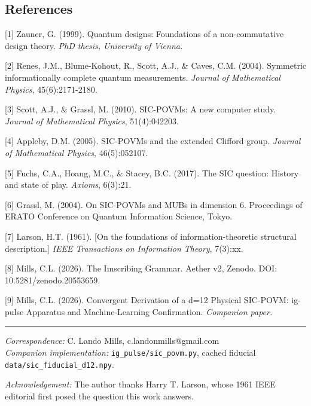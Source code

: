 \hypertarget{references}{%
\subsection{References}\label{references}}

{[}1{]} Zauner, G. (1999). Quantum designs: Foundations of a
non-commutative design theory. \emph{PhD thesis, University of Vienna.}

{[}2{]} Renes, J.M., Blume-Kohout, R., Scott, A.J., \& Caves, C.M.
(2004). Symmetric informationally complete quantum measurements.
\emph{Journal of Mathematical Physics}, 45(6):2171-2180.

{[}3{]} Scott, A.J., \& Grassl, M. (2010). SIC-POVMs: A new computer
study. \emph{Journal of Mathematical Physics}, 51(4):042203.

{[}4{]} Appleby, D.M. (2005). SIC-POVMs and the extended Clifford group.
\emph{Journal of Mathematical Physics}, 46(5):052107.

{[}5{]} Fuchs, C.A., Hoang, M.C., \& Stacey, B.C. (2017). The SIC
question: History and state of play. \emph{Axioms}, 6(3):21.

{[}6{]} Grassl, M. (2004). On SIC-POVMs and MUBs in dimension 6.
Proceedings of ERATO Conference on Quantum Information Science, Tokyo.

{[}7{]} Larson, H.T. (1961). {[}On the foundations of
information-theoretic structural description.{]} \emph{IEEE Transactions
on Information Theory}, 7(3):xx.

{[}8{]} Mills, C.L. (2026). The Imscribing Grammar. Aether v2, Zenodo.
DOI: 10.5281/zenodo.20553659.

{[}9{]} Mills, C.L. (2026). Convergent Derivation of a d=12 Physical
SIC-POVM: ig-pulse Apparatus and Machine-Learning Confirmation.
\emph{Companion paper.}

\begin{center}\rule{0.5\linewidth}{0.5pt}\end{center}

\emph{Correspondence:} C. Lando Mills, c.landonmills@gmail.com\\
\emph{Companion implementation:} \texttt{ig\_pulse/sic\_povm.py}, cached
fiducial \texttt{data/sic\_fiducial\_d12.npy}.

\emph{Acknowledgement:} The author thanks Harry T. Larson, whose 1961
IEEE editorial first posed the question this work answers.
